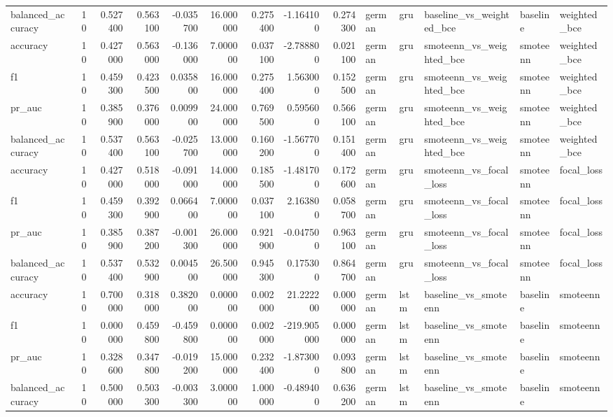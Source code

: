 \begin{tabular}{lrrrrrrrrlllll}
balanced_accuracy & 10 & 0.527400 & 0.563100 & -0.035700 & 16.000000 & 0.275400 & -1.164100 & 0.274300 & german & gru & baseline_vs_weighted_bce & baseline & weighted_bce \\
accuracy & 10 & 0.427000 & 0.563000 & -0.136000 & 7.000000 & 0.037100 & -2.788800 & 0.021100 & german & gru & smoteenn_vs_weighted_bce & smoteenn & weighted_bce \\
f1 & 10 & 0.459300 & 0.423500 & 0.035800 & 16.000000 & 0.275400 & 1.563000 & 0.152500 & german & gru & smoteenn_vs_weighted_bce & smoteenn & weighted_bce \\
pr_auc & 10 & 0.385900 & 0.376000 & 0.009900 & 24.000000 & 0.769500 & 0.595600 & 0.566100 & german & gru & smoteenn_vs_weighted_bce & smoteenn & weighted_bce \\
balanced_accuracy & 10 & 0.537400 & 0.563100 & -0.025700 & 13.000000 & 0.160200 & -1.567700 & 0.151400 & german & gru & smoteenn_vs_weighted_bce & smoteenn & weighted_bce \\
accuracy & 10 & 0.427000 & 0.518000 & -0.091000 & 14.000000 & 0.185500 & -1.481700 & 0.172600 & german & gru & smoteenn_vs_focal_loss & smoteenn & focal_loss \\
f1 & 10 & 0.459300 & 0.392900 & 0.066400 & 7.000000 & 0.037100 & 2.163800 & 0.058700 & german & gru & smoteenn_vs_focal_loss & smoteenn & focal_loss \\
pr_auc & 10 & 0.385900 & 0.387200 & -0.001300 & 26.000000 & 0.921900 & -0.047500 & 0.963100 & german & gru & smoteenn_vs_focal_loss & smoteenn & focal_loss \\
balanced_accuracy & 10 & 0.537400 & 0.532900 & 0.004500 & 26.500000 & 0.945300 & 0.175300 & 0.864700 & german & gru & smoteenn_vs_focal_loss & smoteenn & focal_loss \\
accuracy & 10 & 0.700000 & 0.318000 & 0.382000 & 0.000000 & 0.002000 & 21.222200 & 0.000000 & german & lstm & baseline_vs_smoteenn & baseline & smoteenn \\
f1 & 10 & 0.000000 & 0.459800 & -0.459800 & 0.000000 & 0.002000 & -219.905000 & 0.000000 & german & lstm & baseline_vs_smoteenn & baseline & smoteenn \\
pr_auc & 10 & 0.328600 & 0.347800 & -0.019200 & 15.000000 & 0.232400 & -1.873000 & 0.093800 & german & lstm & baseline_vs_smoteenn & baseline & smoteenn \\
balanced_accuracy & 10 & 0.500000 & 0.503300 & -0.003300 & 3.000000 & 1.000000 & -0.489400 & 0.636200 & german & lstm & baseline_vs_smoteenn & baseline & smoteenn \\

\end{tabular}
